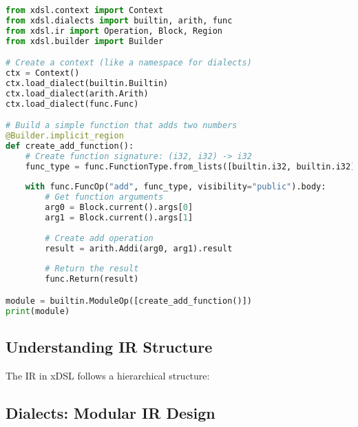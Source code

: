 \documentclass[11pt,a4paper]{article}
\begin{document}
\begin{lstlisting}[language=Python, caption=Creating IR in xDSL]
from xdsl.context import Context
from xdsl.dialects import builtin, arith, func
from xdsl.ir import Operation, Block, Region
from xdsl.builder import Builder

# Create a context (like a namespace for dialects)
ctx = Context()
ctx.load_dialect(builtin.Builtin)
ctx.load_dialect(arith.Arith)
ctx.load_dialect(func.Func)

# Build a simple function that adds two numbers
@Builder.implicit_region
def create_add_function():
    # Create function signature: (i32, i32) -> i32
    func_type = func.FunctionType.from_lists([builtin.i32, builtin.i32], [builtin.i32])
    
    with func.FuncOp("add", func_type, visibility="public").body:
        # Get function arguments
        arg0 = Block.current().args[0]
        arg1 = Block.current().args[1]
        
        # Create add operation
        result = arith.Addi(arg0, arg1).result
        
        # Return the result
        func.Return(result)

module = builtin.ModuleOp([create_add_function()])
print(module)
\end{lstlisting}

\subsection{Understanding IR Structure}

The IR in xDSL follows a hierarchical structure:


\subsection{Dialects: Modular IR Design}
\end{document}
